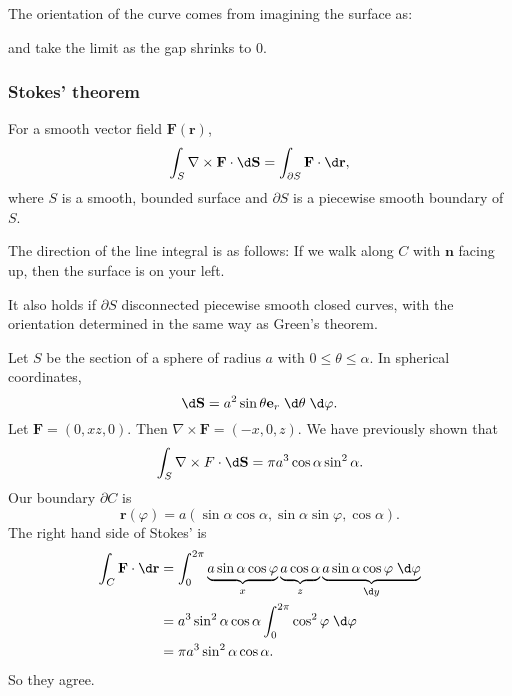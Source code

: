\documentclass[a4paper]{article}
\begin{document}
The orientation of the curve comes from imagining the surface as:
\begin{center}
\end{center}
and take the limit as the gap shrinks to 0.

\subsubsection{Stokes' theorem}
\begin{thm}
  For a smooth vector field $\mathbf{F}(\mathbf{r})$,
  \[
    \int_S \nabla\times \mathbf{F}\cdot \d \mathbf{S} = \int_{\partial S} \mathbf{F}\cdot \d \mathbf{r},
  \]
  where $S$ is a smooth, bounded surface and $\partial S$ is a piecewise smooth boundary of $S$.

  The direction of the line integral is as follows: If we walk along $C$ with $\mathbf{n}$ facing up, then the surface is on your left.
\end{thm}
It also holds if $\partial S$ disconnected piecewise smooth closed curves, with the orientation determined in the same way as Green's theorem.

\begin{eg}
  Let $S$ be the section of a sphere of radius $a$ with $0 \leq \theta \leq \alpha$. In spherical coordinates,
  \[
    \d \mathbf{S} = a^2 \sin \theta \mathbf{e}_r \;\d \theta\;\d \varphi.
  \]
  Let $\mathbf{F} = (0, xz, 0)$. Then $\nabla \times \mathbf{F} = (-x, 0, z)$. We have previously shown that
  \[
    \int_S \nabla\times F\cdot \d \mathbf{S} = \pi a^3 \cos\alpha\sin^2 \alpha.
  \]
  Our boundary $\partial C$ is
  \[
    \mathbf{r}(\varphi) = a(\sin \alpha\cos \alpha, \sin \alpha\sin \varphi, \cos \alpha).
  \]
  The right hand side of Stokes' is
  \begin{align*}
    \int_C \mathbf{F}\cdot \d \mathbf{r}  &= \int_0^{2\pi}\underbrace{a\sin \alpha\cos \varphi}_{x}\underbrace{\vphantom{\varphi}a\cos\alpha}_z \underbrace{a\sin \alpha\cos\varphi\;\d \varphi}_{\d y}\\
    &= a^3\sin^2\alpha\cos\alpha\int_0^{2\pi}\cos^2\varphi\;\d \varphi\\
    &= \pi a^3\sin^2\alpha\cos\alpha.
  \end{align*}
  So they agree.
\end{eg}
\end{document}
